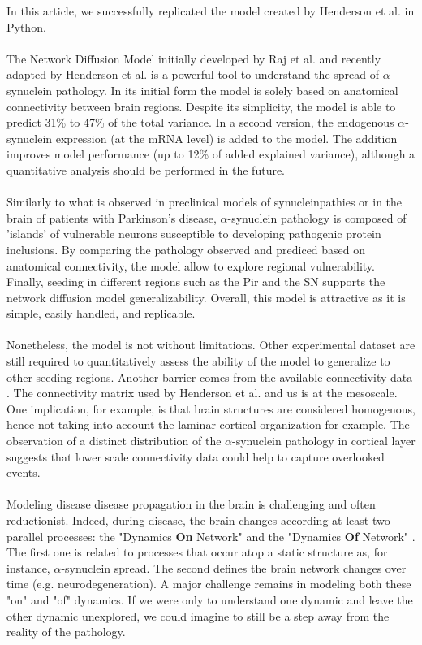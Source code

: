 In this article, we successfully replicated the model created by Henderson et al. in Python.\\
\\
The Network Diffusion Model initially developed by Raj et al. \cite{Raj_2012} and recently adapted by Henderson et al. \cite{Henderson_2019} is a powerful tool to understand the spread of $\alpha$-synuclein pathology. In its initial form the model is solely based on anatomical connectivity between brain regions. Despite its simplicity, the model is able to predict 31\% to 47\% of the total variance. In a second version, the endogenous $\alpha$-synuclein expression (at the mRNA level) is added to the model. The addition improves model performance (up to 12\% of added explained variance), although a quantitative analysis should be performed in the future. \\ 
\\
Similarly to what is observed in preclinical models of synucleinpathies or in the brain of patients with Parkinson's disease, $\alpha$-synuclein pathology is composed of 'islands' of vulnerable neurons susceptible to developing pathogenic protein inclusions. By comparing the pathology observed and prediced based on anatomical connectivity, the model allow to explore regional vulnerability. Finally, seeding in different regions such as the Pir and the SN supports the network diffusion model generalizability. Overall, this model is attractive as it is simple, easily handled, and replicable.\\
\\
Nonetheless, the model is not without limitations. Other experimental dataset are still required to quantitatively assess the ability of the model to generalize to other seeding regions. Another barrier comes from the available connectivity data \cite{Oh_2014}. The connectivity matrix used by Henderson et al. and us is at the mesoscale. One implication, for example, is that brain structures are considered homogenous, hence not taking into account the laminar cortical organization for example. The observation of a distinct distribution of the $\alpha$-synuclein pathology in cortical layer suggests that lower scale connectivity data could help to capture overlooked events.\\
\\
Modeling disease disease propagation in the brain is challenging and often reductionist. Indeed, during disease, the brain changes according at least two parallel processes: the "Dynamics \textbf{On} Network" and the "Dynamics \textbf{Of} Network" \cite{Raj_2018}. The first one is related to processes that occur atop a static structure as, for instance, $\alpha$-synuclein spread. The second defines the brain network changes over time (e.g. neurodegeneration). A major challenge remains in modeling both these "on" and "of" dynamics. If we were only to understand one dynamic and leave the other dynamic unexplored, we could imagine to still be a step away from the reality of the pathology. 
